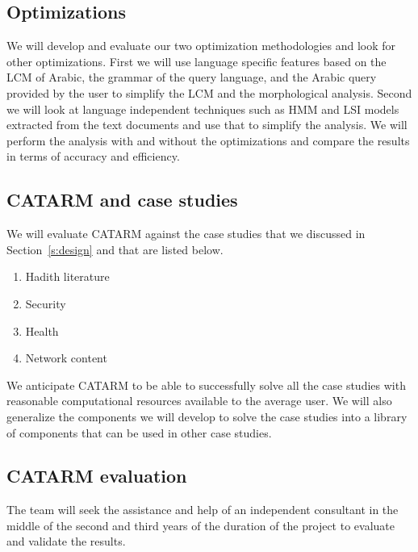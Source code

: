 \documentclass[12pt]{article}
\begin{document}
\subsection{Optimizations}

We will develop and evaluate our two optimization methodologies
and look for other optimizations. 
First we will use language specific features based on the 
LCM of Arabic, the grammar of the query language, and 
the Arabic query provided by the user to simplify 
the LCM and the morphological analysis. 
Second we will look at language independent techniques
such as HMM and LSI models extracted from the 
text documents and use that to simplify the analysis. 
We will perform the analysis with and without the optimizations
and compare the results in terms of accuracy and efficiency. 

\subsection{CATARM and case studies }

We will evaluate CATARM against the case studies
that we discussed in Section~\ref{s:design} and 
that are listed below. 
\begin{enumerate}
\item Hadith literature
\item Security
\item Health
\item Network content
\end{enumerate}

We anticipate CATARM to be able to successfully solve all the case
studies with reasonable computational resources available to the 
average user. 
We will also generalize the components we will develop to solve
the case studies into a library of components that can be used
in other case studies. 

\subsection{CATARM evaluation } 

The team will seek the assistance and help of an independent 
consultant in the middle of the second and third years of 
the duration of the project to evaluate and validate the results.
\end{document}
